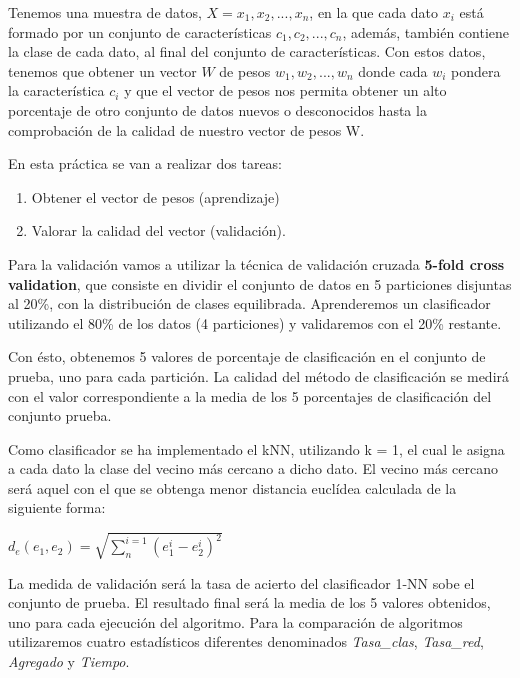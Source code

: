 \documentclass[14pt]{article}
\begin{document}
Tenemos una muestra de datos, $X = {x_{1}, x_{2},...,x_{n}}$, en la que cada dato $x_{i}$ está formado por un conjunto de características ${c_{1}, c_{2},...,c_{n}}$, además, también contiene la clase de cada dato, al final del conjunto de características. Con estos datos, tenemos que obtener un vector $W$ de pesos ${w_{1}, w_{2},...,w_{n}}$ donde cada $w_{i}$ pondera la característica $c_{i}$ y que el vector de pesos nos permita obtener un alto porcentaje de otro conjunto de datos nuevos o desconocidos hasta la comprobación de la calidad de nuestro vector de pesos W.

En esta práctica se van a realizar dos tareas: 

\begin{enumerate}
\item Obtener el vector de pesos (aprendizaje)
\item Valorar la calidad del vector (validación).
\end{enumerate}

Para la validación vamos a utilizar la técnica de validación cruzada \textbf{5-fold cross validation}, que consiste en dividir el conjunto de datos en 5 particiones disjuntas al 20\%, con la distribución de clases equilibrada. Aprenderemos un clasificador utilizando el 80\% de los datos (4 particiones) y validaremos con el 20\% restante.

Con ésto, obtenemos 5 valores de porcentaje de clasificación en el conjunto de prueba, uno para cada partición. La calidad del método de clasificación se medirá con el valor correspondiente a la media de los 5 porcentajes de clasificación del conjunto prueba.

Como clasificador se ha implementado el kNN, utilizando k = 1, el cual le asigna a cada dato la clase del vecino más cercano a dicho dato. El vecino más cercano será aquel con el que se obtenga menor distancia euclídea calculada de la siguiente forma:
\begin{center}
$
d_{e}(e_{1},e_{2}) = \sqrt{\sum_{n}^{i=1}(e_{1}^{i} - e_{2}^{i})^{2}}
$
\end{center}

La medida de validación será la tasa de acierto del clasificador 1-NN sobe el conjunto de prueba. El resultado final será la media de los 5 valores obtenidos, uno para cada ejecución del algoritmo. Para la comparación de algoritmos utilizaremos cuatro estadísticos diferentes denominados \textit{Tasa\_clas}, \textit{Tasa\_red}, \textit{Agregado} y \textit{Tiempo}.
\end{document}
